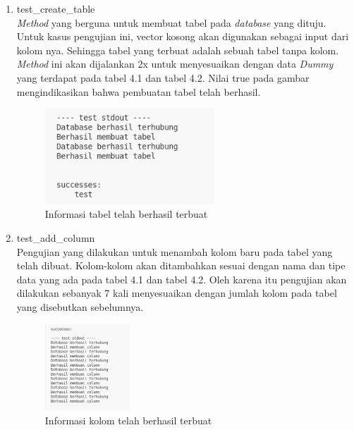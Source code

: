 \begin{enumerate}
	\item test\_create\_table \\
  \emph{Method} yang berguna untuk membuat tabel pada \emph{database} yang dituju. Untuk kasus pengujian ini, vector kosong akan digunakan sebagai input dari kolom nya.
  Sehingga tabel yang terbuat adalah sebuah tabel tanpa kolom. \emph{Method} ini akan dijalankan 2x untuk menyesuaikan dengan data \emph{Dummy} yang terdapat pada tabel 4.1
  dan tabel 4.2. Nilai true pada gambar mengindikasikan bahwa pembuatan tabel telah berhasil.
  \begin{figure}[H]
  	\centering{}
	\includegraphics[width=0.6\textwidth]{gambar/bab4/test-create-table}
  	\caption{Informasi tabel telah berhasil terbuat}
   \end{figure}

	\item test\_add\_column \\
  Pengujian yang dilakukan untuk menambah kolom baru pada tabel yang telah dibuat. Kolom-kolom akan ditambahkan sesuai dengan nama dan tipe data yang ada pada tabel 4.1 dan tabel 4.2. 
  Oleh karena itu pengujian akan dilakukan sebanyak 7 kali menyesuaikan dengan jumlah kolom pada tabel yang disebutkan sebelumnya.
  \begin{figure}[H]
  	\centering{}
	\includegraphics[width=0.3\textwidth]{gambar/bab4/test-create-column}
  	\caption{Informasi kolom telah berhasil terbuat}
   \end{figure}


\end{enumerate}
